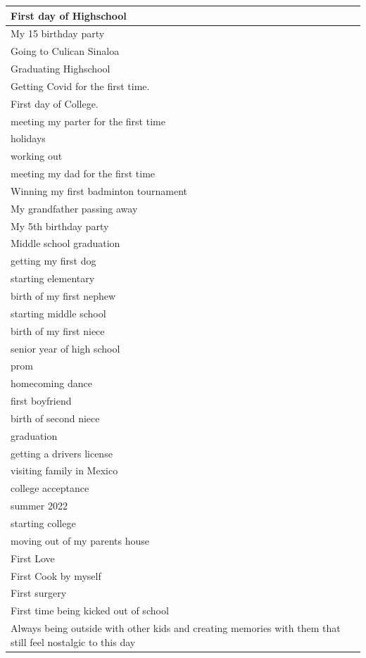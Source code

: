 \documentclass[
  .7em,
  letterpaper,
  DIV=11,
  numbers=noendperiod]{scrartcl}
\begin{document}
\begin{table}
\begin{tabular}{l}
\hline
First day of Highschool\\
\hline
My 15 birthday party\\
\hline
Going to Culican Sinaloa\\
\hline
Graduating Highschool\\
\hline
Getting Covid for the first time.\\
\hline
First day of College.\\
\hline
meeting my parter for the first time\\
\hline
holidays\\
\hline
working out\\
\hline
meeting my dad for the first time\\
\hline
Winning my first badminton tournament\\
\hline
My grandfather passing away\\
\hline
My 5th birthday party\\
\hline
Middle school graduation\\
\hline
getting my first dog\\
\hline
starting elementary\\
\hline
birth of my first nephew\\
\hline
starting middle school\\
\hline
birth of my first niece\\
\hline
senior year of high school\\
\hline
prom\\
\hline
homecoming dance\\
\hline
first boyfriend\\
\hline
birth of second niece\\
\hline
graduation\\
\hline
getting a drivers license\\
\hline
visiting family in Mexico\\
\hline
college acceptance\\
\hline
summer 2022\\
\hline
starting college\\
\hline
moving out of my parents house\\
\hline
First Love\\
\hline
First Cook by myself\\
\hline
First surgery\\
\hline
First time being kicked out of school\\
\hline
Always being outside with other kids and creating memories with them that still feel nostalgic to this day\\

\end{tabular}
\end{table}
\end{document}
